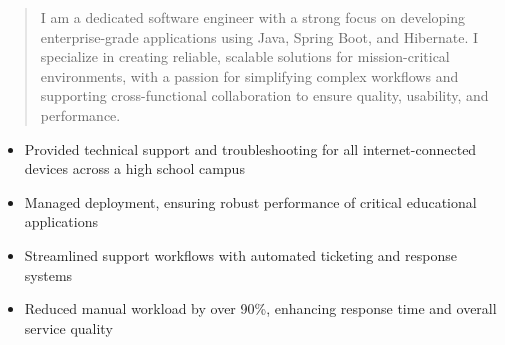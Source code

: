 



\makecvheader

\begin{quote}
  \noindent
  I am a dedicated software engineer with a strong focus on developing enterprise-grade applications using Java, Spring Boot, and Hibernate. I specialize in creating reliable, scalable solutions for mission-critical environments, with a passion for simplifying complex workflows and supporting cross-functional collaboration to ensure quality, usability, and performance.
\end{quote}

\par\smallskip
\noindent
\begin{minipage}{20cm}
  \begin{minipage}{9.75cm}
    \begin{itemize}
      \item Provided technical support and troubleshooting for all internet-connected devices across a high school campus
      \item Managed deployment, ensuring robust performance of critical educational applications
    \end{itemize}
  \end{minipage}
  \hfill
  \begin{minipage}{9.75cm}
    \begin{itemize}
      \item Streamlined support workflows with automated ticketing and response systems
      \item Reduced manual workload by over 90\%, enhancing response time and overall service quality
    \end{itemize}
  \end{minipage}
\end{minipage}
\par\smallskip
\divider

